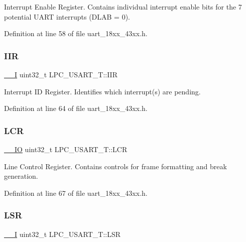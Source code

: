 Interrupt Enable Register. Contains individual interrupt enable bits for the 7 potential U\+A\+RT interrupts (D\+L\+AB = 0). 

Definition at line 58 of file uart\+\_\+18xx\+\_\+43xx.\+h.

\mbox{\label{struct_l_p_c___u_s_a_r_t___t_a470cdb18abc446a9768f404314c4a556}} 
\subsubsection{\texorpdfstring{I\+IR}{IIR}}
{\footnotesize\ttfamily \hyperlink{core__sc300_8h_af63697ed9952cc71e1225efe205f6cd3}{\+\_\+\+\_\+I} uint32\+\_\+t L\+P\+C\+\_\+\+U\+S\+A\+R\+T\+\_\+\+T\+::\+I\+IR}

Interrupt ID Register. Identifies which interrupt(s) are pending. 

Definition at line 64 of file uart\+\_\+18xx\+\_\+43xx.\+h.

\mbox{\label{struct_l_p_c___u_s_a_r_t___t_aee4d95152fdd5222436368295e4307c2}} 
\subsubsection{\texorpdfstring{L\+CR}{LCR}}
{\footnotesize\ttfamily \hyperlink{core__sc300_8h_aec43007d9998a0a0e01faede4133d6be}{\+\_\+\+\_\+\+IO} uint32\+\_\+t L\+P\+C\+\_\+\+U\+S\+A\+R\+T\+\_\+\+T\+::\+L\+CR}

Line Control Register. Contains controls for frame formatting and break generation. 

Definition at line 67 of file uart\+\_\+18xx\+\_\+43xx.\+h.

\mbox{\label{struct_l_p_c___u_s_a_r_t___t_a71f711aab2dc24f42d183abd449ce829}} 
\subsubsection{\texorpdfstring{L\+SR}{LSR}}
{\footnotesize\ttfamily \hyperlink{core__sc300_8h_af63697ed9952cc71e1225efe205f6cd3}{\+\_\+\+\_\+I} uint32\+\_\+t L\+P\+C\+\_\+\+U\+S\+A\+R\+T\+\_\+\+T\+::\+L\+SR}

